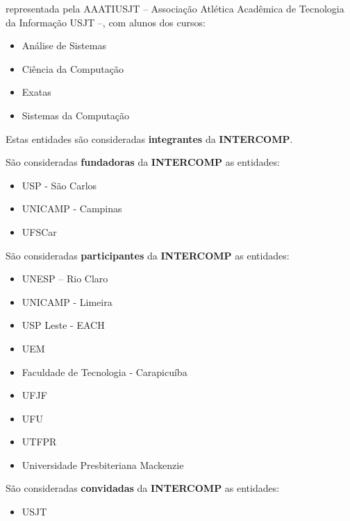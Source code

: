 \begin{article}
\begin{description}[noitemsep]
		\item[Universidade São Judas Tadeu] representada pela AAATIUSJT -- Associação Atlética Acadêmica de Tecnologia da Informação USJT --, com alunos dos cursos:
		\begin{itemize}[noitemsep]
			\item Análise de Sistemas
			\item Ciência da Computação
			\item Exatas
			\item Sistemas da Computação
		\end{itemize}
	\end{description}

	\begin{xparagraph}
		Estas entidades são consideradas \textbf{integrantes} da \textbf{INTERCOMP}.
	\end{xparagraph}

	\begin{xparagraph}
		São consideradas \textbf{fundadoras} da \textbf{INTERCOMP} as entidades:
		\begin{itemize}[noitemsep,leftmargin=2\parindent]
			\item USP - São Carlos
			\item UNICAMP - Campinas
			\item UFSCar
		\end{itemize}
	\end{xparagraph}

	\begin{xparagraph}
		São consideradas \textbf{participantes} da \textbf{INTERCOMP} as entidades:
		\begin{itemize}[noitemsep,leftmargin=2\parindent]
			\item UNESP – Rio Claro
			\item UNICAMP - Limeira
			\item USP Leste - EACH
			\item UEM
			\item Faculdade de Tecnologia - Carapicuíba
			\item UFJF
			\item UFU
			\item UTFPR
			\item Universidade Presbiteriana Mackenzie
		\end{itemize}
	\end{xparagraph}

	\begin{xparagraph}
		São consideradas \textbf{convidadas} da \textbf{INTERCOMP} as entidades:
		\begin{itemize}[noitemsep,leftmargin=2\parindent]
			\item USJT
		\end{itemize}
	\end{xparagraph}


\end{article}

